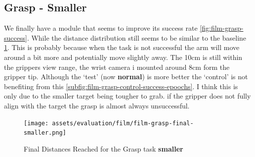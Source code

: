 \subsection{Grasp - Smaller}
We finally have a module that seems to improve its success rate \ref{fig:film-grasp-success}. While the distance distribution still seems to be similar to the baseline \ref{fig:film-grasp-final-smaller}. This is probably because when the task is not successful the arm will move around a bit more and potentially move slightly away. The 10cm is still within the grippers view range, the wrist camera i mounted around 8cm form the gripper tip. Although the `test' (now \textbf{normal}) is more better the `control' is not benefiting from this \ref{subfig:film-grasp-control-success-epoochs}. I think this is only  due to the smaller target being tougher to grab. if the gripper does not fully align with the target the grasp is almost always unsuccessful. 


\begin{figure}[H]
  \centering
  \texttt{[image: assets/evaluation/film/film-grasp-final-smaller.png]}
  \caption{Final Distances Reached for the Grasp task \textbf{smaller}}\label{fig:film-grasp-final-smaller}
\end{figure}

